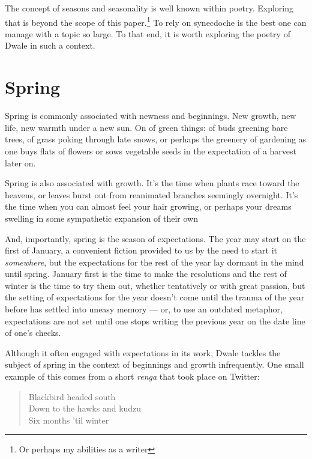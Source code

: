 \documentclass{memoir}
\begin{document}
The concept of seasons and seasonality is well known within poetry. Exploring that is beyond the scope of this paper.\footnote{Or perhaps my abilities as a writer} To rely on synecdoche is the best one can manage with a topic so large. To that end, it is worth exploring the poetry of Dwale in such a context.

\section*{Spring}

Spring is commonly associated with newness and beginnings. New growth, new life, new warmth under a new sun. On of green things: of buds greening bare trees, of grass poking through late snows, or perhaps the greenery of gardening as one buys flats of flowers or sows vegetable seeds in the expectation of a harvest later on.

Spring is also associated with growth. It's the time when plants race toward the heavens, or leaves burst out from reanimated branches seemingly overnight. It's the time when you can almost feel your hair growing, or perhaps your dreams swelling in some sympathetic expansion of their own

And, importantly, spring is the season of expectations. The year may start on the first of January, a convenient fiction provided to us by the need to start it \emph{somewhere}, but the expectations for the rest of the year lay dormant in the mind until spring. January first is the time to make the resolutions and the rest of winter is the time to try them out, whether tentatively or with great passion, but the setting of expectations for the year doesn't come until the trauma of the year before has settled into uneasy memory ---  or, to use an outdated metaphor, expectations are not set until one stops writing the previous year on the date line of one's checks.

Although it often engaged with expectations in its work, Dwale tackles the subject of spring in the context of beginnings and growth infrequently. One small example of this comes from a short \emph{renga} that took place on Twitter:

\begin{verse}
Blackbird headed south\\
Down to the hawks and kudzu\\
Six months 'til winter

\parencite{dwale_haiku}
\end{verse}
\end{document}
